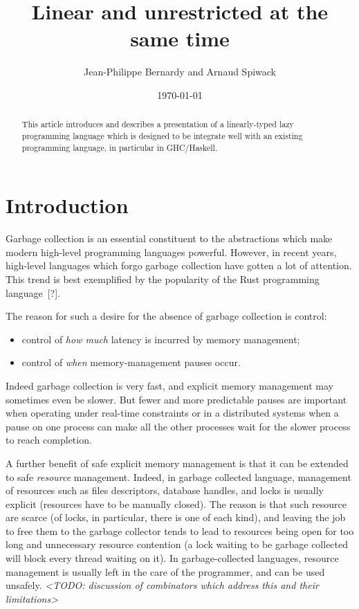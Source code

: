 \documentclass[11pt]{article}
\author{Jean-Philippe Bernardy and Arnaud Spiwack}
\date{\today}
\title{Linear and unrestricted at the same time}
\newcommand{\citationneeded}{[?]}
\newcommand{\TODO}[1]{{\footnotesize\it <TODO: #1>}}
\begin{document}
\maketitle
\begin{abstract}
  \noindent This article introduces and describes a presentation of a
  linearly-typed lazy programming language which is designed to be
  integrate well with an existing programming language, in particular
  in GHC/Haskell.
\end{abstract}

\setcounter{tocdepth}{3}
\tableofcontents

\section{Introduction}

Garbage collection is an essential constituent to the abstractions
which make modern high-level programming languages powerful. However,
in recent years, high-level languages which forgo garbage collection
have gotten a lot of attention. This trend is best exemplified by the
popularity of the Rust programming language~\citationneeded.

The reason for such a desire for the absence of garbage collection is
control:
\begin{itemize}
\item control of \emph{how much} latency is incurred by memory management;
\item control of \emph{when} memory-management pauses occur.
\end{itemize}
Indeed garbage collection is very fast, and explicit memory management
may sometimes even be slower. But fewer and more predictable pauses are
important when operating under real-time constraints or in a
distributed systems when a pause on one process can make all the other
processes wait for the slower process to reach completion.

A further benefit of safe explicit memory management is that it can be
extended to safe \emph{resource} management. Indeed, in garbage
collected language, management of resources such as files descriptors,
database handles, and locks is usually explicit (resources have to be
manually closed). The reason is that such resource are scarce (of
locks, in particular, there is one of each kind), and leaving the job
to free them to the garbage collector tends to lead to resources being
open for too long and unnecessary resource contention (a lock waiting
to be garbage collected will block every thread waiting on it). In
garbage-collected languages, resource management is usually left in
the care of the programmer, and can be used unsafely. \TODO{discussion
  of combinators which address this and their limitations}
\end{document}
